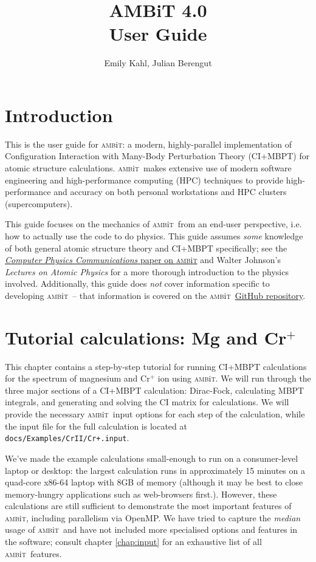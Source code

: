 \documentclass{report}
\newcommand{\ambit}{\textsc{amb}{\footnotesize i}\textsc{t}}
\begin{document}
\title{AMBiT 4.0\\User Guide}
\author{Emily Kahl, Julian Berengut}
\date{}
\maketitle

\tableofcontents

\chapter{Introduction}
This is the user guide for \ambit: a modern, highly-parallel implementation of Configuration Interaction
with Many-Body Perturbation Theory (CI+MBPT) for atomic structure calculations. \ambit\ makes extensive 
use of modern software engineering and high-performance computing (HPC) techniques to provide 
high-performance and accuracy on both personal workstations and HPC clusters (supercomputers).

This guide focuses on the mechanics of \ambit\ from an end-user perspective, i.e. how to actually use the
code to do physics. This guide assumes \emph{some} knowledge of both general atomic structure theory and
CI+MBPT specifically; see the \href{https://doi.org/10.1016/j.cpc.2018.12.014}{\textit{Computer Physics Communications} paper on 
\ambit} and Walter Johnson's \textit{Lectures on Atomic Physics} for a more thorough 
introduction to the physics involved. Additionally, this guide does \emph{not} cover information 
specific to developing \ambit\ -- that information is covered on the \ambit\  
\href{https://github.com/drjuls/AMBiT}{GitHub repository}.

\chapter{Tutorial calculations: Mg and Cr$^+$}

This chapter contains a step-by-step tutorial for running CI+MBPT calculations for the spectrum of magnesium and 
Cr$^+$ ion using \ambit. We will run through the three major sections of a CI+MBPT calculation:
Dirac-Fock, calculating MBPT integrals, and generating and solving the CI matrix for calculations. We
will provide the necessary \ambit\  input options for each step of the calculation, while the input file
for the full calculation is located at \texttt{docs/Examples/CrII/Cr+.input}.

We've made the example calculations small-enough to run on a consumer-level laptop or desktop: the
largest calculation runs in approximately 15 minutes on a quad-core x86-64 laptop with 8GB of
memory (although it may be best to close memory-hungry applications such as web-browsers
first.). However, these calculations are still sufficient to demonstrate the most important features of 
\ambit, including parallelism via OpenMP. We have tried to capture the \textit{median} usage of \ambit\ 
and have not included more specialised options and features in the software; consult chapter
\ref{chap:input} for an exhaustive list of all \ambit\  features.
\end{document}
